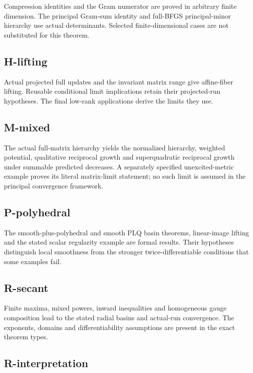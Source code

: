 Compression identities and the Gram numerator are proved in arbitrary finite dimension. The principal Gram-sum identity and full-BFGS principal-minor hierarchy use actual determinants. Selected finite-dimensional cases are not substituted for this theorem.

\subsection{H-lifting}\label{h-lifting}

Actual projected full updates and the invariant matrix range give affine-fiber lifting. Reusable conditional limit implications retain their projected-run hypotheses. The final low-rank applications derive the limits they use.

\subsection{M-mixed}\label{m-mixed}

The actual full-matrix hierarchy yields the normalized hierarchy, weighted potential, qualitative reciprocal growth and superquadratic reciprocal growth under summable predicted decreases. A separately specified unexcited-metric example proves its literal matrix-limit statement; no such limit is assumed in the principal convergence framework.

\subsection{P-polyhedral}\label{p-polyhedral}

The smooth-plus-polyhedral and smooth PLQ basin theorems, linear-image lifting and the stated scalar regularity example are formal results. Their hypotheses distinguish local smoothness from the stronger twice-differentiable conditions that some examples fail.

\subsection{R-secant}\label{r-secant}

Finite maxima, mixed powers, inward inequalities and homogeneous gauge composition lead to the stated radial basins and actual-run convergence. The exponents, domains and differentiability assumptions are present in the exact theorem types.

\subsection{R-interpretation}\label{r-interpretation}

